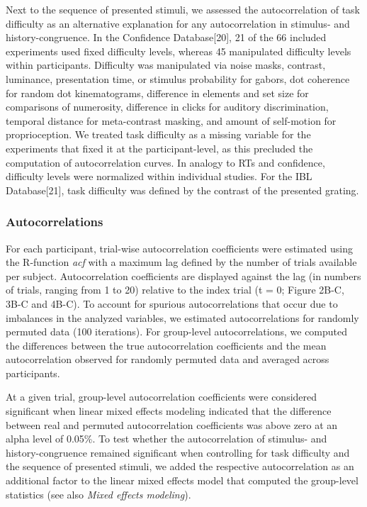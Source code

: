 \documentclass[
]{article}
\begin{document}
Next to the sequence of presented stimuli, we assessed the
autocorrelation of task difficulty as an alternative explanation for any
autocorrelation in stimulus- and history-congruence. In the Confidence
Database{[}20{]}, 21 of the 66 included experiments used fixed
difficulty levels, whereas 45 manipulated difficulty levels within
participants. Difficulty was manipulated via noise masks, contrast,
luminance, presentation time, or stimulus probability for gabors, dot
coherence for random dot kinematograms, difference in elements and set
size for comparisons of numerosity, difference in clicks for auditory
discrimination, temporal distance for meta-contrast masking, and amount
of self-motion for proprioception. We treated task difficulty as a
missing variable for the experiments that fixed it at the
participant-level, as this precluded the computation of autocorrelation
curves. In analogy to RTs and confidence, difficulty levels were
normalized within individual studies. For the IBL Database{[}21{]}, task
difficulty was defined by the contrast of the presented grating.

\hypertarget{autocorrelations}{%
\subsubsection{Autocorrelations}\label{autocorrelations}}

For each participant, trial-wise autocorrelation coefficients were
estimated using the R-function \emph{acf} with a maximum lag defined by
the number of trials available per subject. Autocorrelation coefficients
are displayed against the lag (in numbers of trials, ranging from 1 to
20) relative to the index trial (t = 0; Figure 2B-C, 3B-C and 4B-C). To
account for spurious autocorrelations that occur due to imbalances in
the analyzed variables, we estimated autocorrelations for randomly
permuted data (100 iterations). For group-level autocorrelations, we
computed the differences between the true autocorrelation coefficients
and the mean autocorrelation observed for randomly permuted data and
averaged across participants.

At a given trial, group-level autocorrelation coefficients were
considered significant when linear mixed effects modeling indicated that
the difference between real and permuted autocorrelation coefficients
was above zero at an alpha level of 0.05\%. To test whether the
autocorrelation of stimulus- and history-congruence remained significant
when controlling for task difficulty and the sequence of presented
stimuli, we added the respective autocorrelation as an additional factor
to the linear mixed effects model that computed the group-level
statistics (see also \emph{Mixed effects modeling}).
\end{document}

